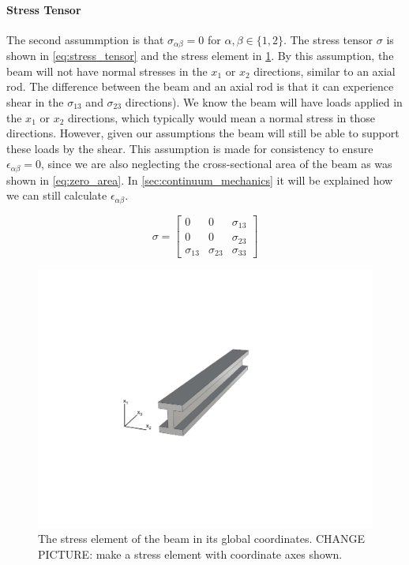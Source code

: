 \paragraph{Stress Tensor}
The second assummption is that $\sigma_{\alpha\beta}=0$ for $\alpha,\beta \in \{1,2\}$.
The stress tensor $\sigma$ is shown in \cref{eq:stress_tensor} and the stress element in \cref{fig:stress_element}.
By this assumption, the beam will not have normal stresses in the $x_1$ or $x_2$ directions, similar to an axial rod.
The difference between the beam and an axial rod is that it can experience shear in the $\sigma_{13}$ and $\sigma_{23}$ directions).
We know the beam will have loads applied in the $x_1$ or $x_2$ directions, which typically would mean a normal stress in those directions.
However, given our assumptions the beam will still be able to support these loads by the shear.
This assumption is made for consistency to ensure $\epsilon_{\alpha\beta} = 0$, since we are also neglecting the cross-sectional area of the beam as was shown in \cref{eq:zero_area}.
In \cref{sec:continuum_mechanics} it will be explained how we can still calculate $\epsilon_{\alpha\beta}$.

\begin{equation}
\sigma = \begin{bmatrix}
0 & 0 & \sigma_{13} \\
0 & 0 & \sigma_{23} \\
\sigma_{13} & \sigma_{23} & \sigma_{33}
\end{bmatrix}
\label{eq:stress_tensor}
\end{equation}

\begin{figure}%
\centering
\includegraphics[width=0.95\columnwidth,trim=4cm 7cm 6cm 6.5cm, clip]{figs/straight.pdf}
\caption{The stress element of the beam in its global coordinates. CHANGE PICTURE: make a stress element with coordinate axes shown.}
\label{fig:stress_element}
\end{figure}

